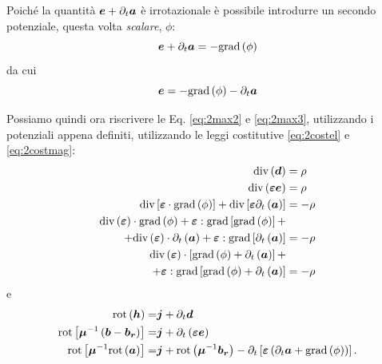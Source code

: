 Poiché la quantità $\boldsymbol{e}+\partial_t\boldsymbol{a}$ è irrotazionale è possibile introdurre un secondo potenziale, questa volta \textit{scalare}, $\phi$:
\begin{equation}
\label{eq:2potsca}
\boldsymbol{e}+\partial_t\boldsymbol{a} = - \text{grad}\left(\phi\right)
\end{equation}
da cui
\begin{equation}
\label{eq:2potsca2}
\boldsymbol{e} = - \text{grad}\left(\phi\right)-\partial_t\boldsymbol{a}
\end{equation}

Possiamo quindi ora riscrivere le Eq. \eqref{eq:2max2} e \eqref{eq:2max3}, utilizzando i potenziali appena definiti, utilizzando le leggi costitutive \eqref{eq:2costel} e \eqref{eq:2costmag}:
\begin{align}
\label{eq:2pot1}
\text{div}\left(\boldsymbol{d}\right)&=\rho\nonumber\\
\text{div}\left(\boldsymbol{\varepsilon}\boldsymbol{e}\right) &= \rho \nonumber\\
\text{div} \left[ \boldsymbol{\varepsilon} \cdot \text{grad} \left( \phi \right) \right] + \text{div} \left[ \boldsymbol{\varepsilon} \partial_t \left( \boldsymbol{a} \right) \right] &= -\rho \nonumber\\
\text{div} \left( \boldsymbol{\varepsilon} \right) \cdot \text{grad} \left( \phi \right) + \boldsymbol{\varepsilon} : \text{grad} \left[ \text{grad} \left( \phi \right) \right] + & \nonumber\\
+\text{div} \left( \boldsymbol{\varepsilon} \right) \cdot \partial_t \left( \boldsymbol{a} \right) + \boldsymbol{\varepsilon} : \text{grad} \left[ \partial_t \left( \boldsymbol{a} \right) \right] & = - \rho\nonumber\\
\text{div} \left( \boldsymbol{\varepsilon} \right) \cdot \left[ \text{grad} \left( \phi \right) +\partial_t \left( \boldsymbol{a} \right) \right]+&\nonumber\\
+\boldsymbol{\varepsilon} :  \text{grad} \left[ \text{grad} \left( \phi \right)  + \partial_t \left( \boldsymbol{a} \right) \right]& = - \rho
\end{align}
e
\begin{align}
\label{eq:2pot2}
\text{rot} \left( \boldsymbol{h} \right) =& \boldsymbol{j}+ \partial_t \boldsymbol{d} \nonumber\\
\text{rot} \left[ \boldsymbol{\mu}^{-1} \left( \boldsymbol{b}-\boldsymbol{b_r} \right) \right] =& \boldsymbol{j}+\partial_t \left(\boldsymbol{\varepsilon} \boldsymbol{e} \right)\nonumber\\
\text{rot} \left[ \boldsymbol{\mu}^{-1} \text{rot}\left(\boldsymbol{a}\right) \right] =& \boldsymbol{j}+\text{rot}\left(\boldsymbol{\mu}^{-1}\boldsymbol{b_r}\right)-\partial_t \left[\boldsymbol{\varepsilon} \left(\partial_t \boldsymbol{a}+\text{grad}\left(\phi\right)\right) \right].
\end{align}

